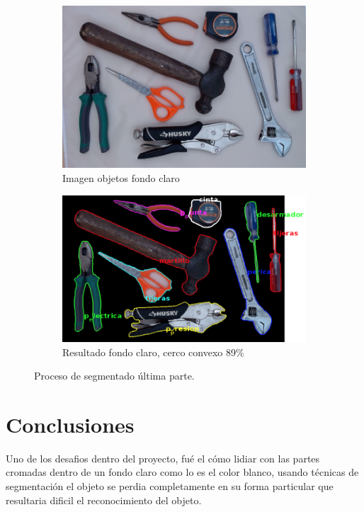 \documentclass[a4paper, 11pt]{article}
\begin{document}
\begin{figure}[h]
  \begin{subfigure}{0.5\linewidth}
    \includegraphics[width=\linewidth]{resultados_colores/todo_claro}
    \caption{Imagen objetos fondo claro}
    \label{fig:1a}
  \end{subfigure}\hfill
  \begin{subfigure}{0.5\linewidth}
    \includegraphics[width=\linewidth]{resultados_colores/resultado_claro_cconvexo_0_89}
    \caption{Resultado fondo claro, cerco convexo 89\%}
    \label{fig:1a}
  \end{subfigure}
  \caption{Proceso de segmentado última parte.}
  \label{fig:1}
\end{figure}


\newpage
\section{Conclusiones}

Uno de los desafios dentro del proyecto, fué el cómo lidiar con las partes cromadas dentro de un fondo claro como lo es el color blanco, usando técnicas de segmentación el objeto se perdia completamente en su forma particular que resultaria dificil el reconocimiento del objeto.\\
\end{document}
